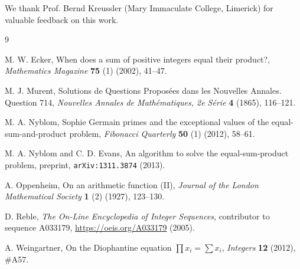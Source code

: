 \documentclass[10pt]{article}
\makeatletter
\renewcommand\section{\@startsection {section}{1}{\z@}
  {-30pt \@plus -1ex \@minus -.2ex}
  {2.3ex \@plus .2ex}
  {\normalfont\normalsize\bfseries\boldmath}}
\theoremstyle{definition}
\theoremstyle{remark}
\numberwithin{equation}{section}
\makeatother
\begin{document}
%
%
%
%
%
%
%
%
%
%


\vskip 20pt 
We thank Prof. Bernd Kreussler (Mary Immaculate College, Limerick) for valuable feedback on this work.
\begin{thebibliography}{9}

 M. W. Ecker, When does a sum of positive integers equal their product?, {\it Mathematics Magazine} {\bf 75} (1) (2002), 41--47.

 M. J. Murent, Solutions de Questions Proposées dans les Nouvelles Annales. Question 714, {\it Nouvelles Annales de Mathématiques, 2e Série} {\bf 4} (1865), 116--121.

 M. A. Nyblom, Sophie Germain primes and the exceptional values of the equal-sum-and-product problem, {\it Fibonacci Quarterly} {\bf 50} (1) (2012), 58--61.

 M. A. Nyblom and C. D. Evans, An algorithm to solve the equal-sum-product problem, preprint, {\tt arXiv:1311.3874} (2013).

 A. Oppenheim, On an arithmetic function (II), {\it Journal of the London Mathematical Society} {\bf 1} (2) (1927), 123--130.

 D. Reble, {\it The On-Line Encyclopedia of Integer Sequences}, contributor to sequence A033179, \url{https://oeis.org/A033179} (2005).

 A. Weingartner, On the Diophantine equation \(\prod x_i = \sum x_i\), {\it Integers} {\bf 12} (2012), \#A57.

\end{thebibliography}
\end{document}
